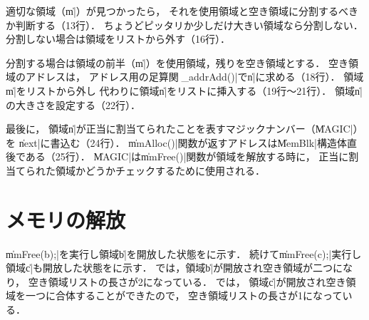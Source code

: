 適切な領域（\|m|）が見つかったら，
それを使用領域と空き領域に分割するべきか判断する（13行）．
ちょうどピッタリか少しだけ大きい領域なら分割しない．
分割しない場合は領域をリストから外す（16行）．

分割する場合は領域の前半（\|m|）を使用領域，残りを空き領域とする．
空き領域のアドレスは，
アドレス用の足算関数\|_addrAdd()|で\|n|に求める（18行）．
領域\|m|をリストから外し
代わりに領域\|n|をリストに挿入する（19行〜21行）．
領域\|n|の大きさを設定する（22行）．

最後に，
領域\|n|が正当に割当てられたことを表すマジックナンバー（\|MAGIC|）を
\|next|に書込む（24行）．
\|mmAlloc()|関数が返すアドレスは\|MemBlk|構造体直後である（25行）．
\|MAGIC|は\|mmFree()|関数が領域を解放する時に，
正当に割当てられた領域かどうかチェックするために使用される．

\section{メモリの解放}
\|mmFree(b);|を実行し領域\|b|を開放した状態をに示す．
続けて\|mmFree(c);|実行し領域\|c|も開放した状態をに示す．
では，領域\|b|が開放され空き領域が二つになり，
空き領域リストの長さが2になっている．
では，
領域\|c|が開放され空き領域を一つに合体することができたので，
空き領域リストの長さが1になっている．

